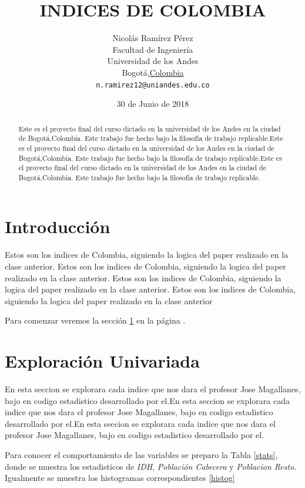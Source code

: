 \documentclass{article}
\title{INDICES DE COLOMBIA}
\author{
        Nicolás Ramírez Pérez\\
        Facultad de Ingeniería\\
        Universidad de los Andes\\
        Bogotá,\underline{Colombia}\\
        \texttt{n.ramirez12@uniandes.edu.co}
}
\date{30 de Junio de 2018}
\begin{document}

\maketitle


\begin{abstract}
Este es el proyecto final del curso dictado en la universidad de los Andes en la ciudad de Bogotá,Colombia. Este trabajo fue hecho bajo la filosofía de trabajo replicable.Este es el proyecto final del curso dictado en la universidad de los Andes en la ciudad de Bogotá,Colombia. Este trabajo fue hecho bajo la filosofía de trabajo replicable.Este es el proyecto final del curso dictado en la universidad de los Andes en la ciudad de Bogotá,Colombia. Este trabajo fue hecho bajo la filosofía de trabajo replicable.
\end{abstract}



\section*{Introducción}

Estos son los indices de Colombia, siguiendo la logica del paper realizado en la clase anterior. Estos son los indices de Colombia, siguiendo la logica del paper realizado en la clase anterior. Estos son los indices de Colombia, siguiendo la logica del paper realizado en la clase anterior. Estos son los indices de Colombia, siguiendo la logica del paper realizado en la clase anterior

Para comenzar veremos la sección \ref{univariada} en la página \pageref{univariada}.
\clearpage

\section{Exploración Univariada}\label{univariada}
En esta seccion se explorara cada indice que nos dara el profesor Jose Magallanes, bajo en codigo estadistico desarrollado por el.En esta seccion se explorara cada indice que nos dara el profesor Jose Magallanes, bajo en codigo estadistico desarrollado por el.En esta seccion se explorara cada indice que nos dara el profesor Jose Magallanes, bajo en codigo estadistico desarrollado por el.


Para conocer el comportamiento de las variables se preparo la Tabla \ref{stats}, donde se muestra los estadisticos de \emph{IDH}, \emph{Población Cabecera}  y \emph{Poblacion Resto}. Igualmente se muestra los histogramas correspondientes \ref{histog}
\end{document}
